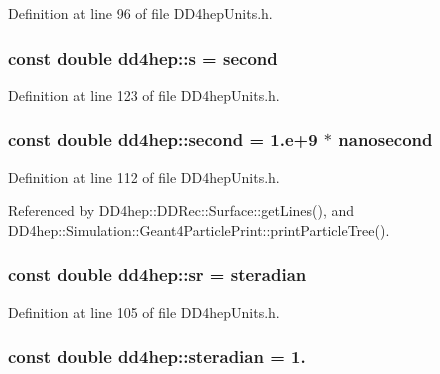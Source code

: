 Definition at line 96 of file DD4hepUnits.h.\hypertarget{namespacedd4hep_a016f64f3a4662ba41ea7f04ba2d59ef5}{
\subsubsection[{s}]{\setlength{\rightskip}{0pt plus 5cm}const double {\bf dd4hep::s} = {\bf second}}}
\label{namespacedd4hep_a016f64f3a4662ba41ea7f04ba2d59ef5}


Definition at line 123 of file DD4hepUnits.h.\hypertarget{namespacedd4hep_ac03364576705a245265d8ed6ea26b871}{
\subsubsection[{second}]{\setlength{\rightskip}{0pt plus 5cm}const double {\bf dd4hep::second} = 1.e+9 $\ast$ {\bf nanosecond}}}
\label{namespacedd4hep_ac03364576705a245265d8ed6ea26b871}


Definition at line 112 of file DD4hepUnits.h.

Referenced by DD4hep::DDRec::Surface::getLines(), and DD4hep::Simulation::Geant4ParticlePrint::printParticleTree().\hypertarget{namespacedd4hep_a873790b393da6dc353009c99dfa88b6e}{
\subsubsection[{sr}]{\setlength{\rightskip}{0pt plus 5cm}const double {\bf dd4hep::sr} = {\bf steradian}}}
\label{namespacedd4hep_a873790b393da6dc353009c99dfa88b6e}


Definition at line 105 of file DD4hepUnits.h.\hypertarget{namespacedd4hep_a0a902cdeced2ad28da2d32515e540867}{
\subsubsection[{steradian}]{\setlength{\rightskip}{0pt plus 5cm}const double {\bf dd4hep::steradian} = 1.}}
\label{namespacedd4hep_a0a902cdeced2ad28da2d32515e540867}


